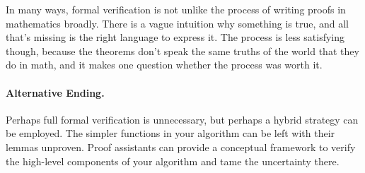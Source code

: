 \documentclass{article}
\begin{document}
In many ways, formal verification is not unlike the process of writing proofs in mathematics broadly.
There is a vague intuition why something is true, and all that's missing is the right language to express it.
The process is less satisfying though, because the theorems don't speak the same truths of the world that they do in math, and it makes one question whether the process was worth it.

\paragraph{Alternative Ending.}
Perhaps full formal verification is unnecessary, but perhaps a hybrid strategy can be employed.
The simpler functions in your algorithm can be left with their lemmas unproven.
Proof assistants can provide a conceptual framework to verify the high-level components of your algorithm and tame the uncertainty there.



\end{document}

